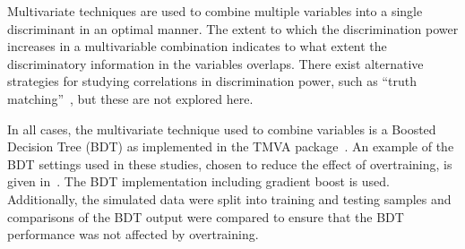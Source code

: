 \noindent

Multivariate techniques are used to combine multiple variables into a
single discriminant in an optimal manner. The extent to which the discrimination power
increases in a multivariable combination indicates to what extent the
discriminatory information in the variables overlaps. There exist alternative
 strategies for studying correlations in discrimination power, such as 
 ``truth matching''~\cite{Larkoski:2014pca}, but these are not explored here.

In all cases, the multivariate technique used to combine variables is
a Boosted Decision Tree (BDT) as implemented in the TMVA
package~\cite{Hocker:2007ht}. An example of the BDT settings used in
these studies, chosen to reduce the effect of overtraining, is given
in~\cite{Hocker:2007ht}. The BDT implementation including gradient
boost is used.
Additionally, the simulated data were split into training and testing samples and comparisons of the BDT output were compared to ensure that the BDT performance was not affected by overtraining.  
